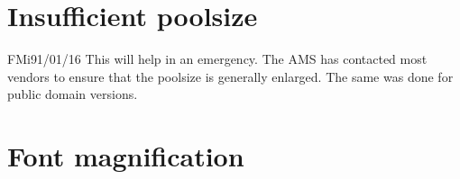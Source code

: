 \tableofcontents

\section{Insufficient poolsize}

\begin{comment}{TF}{91/01/02}
While installing the ``font selection scheme'' from
Mittelbach/Sch\"opf (together with the \ams -Fonts), I
detected several inaccurations which caused runtime
errors under PC\TeX (Ver. 2.93).

Using \ams -Fonts the \TeX -poolsize is exhausted soon,
calling only a few math symbols. While PC\TeX\ users
aren't able to increase the poolsize in the WEB-File
they have to patch the poolfile {\tt tex.poo} (please
make a backup before) which is to be found in the
subdirectory \verb'\pctex\texfmts'.

Normally this file has a structure like
\begin{verbatim}
  nnhelpmessage follows here
\end{verbatim}
each line, for example
\begin{verbatim}
  28End of file on the terminal!
\end{verbatim}
  where {\tt nn} defines the number of characters
  following. PC\TeX\ users can increase their poolsize
  by changing the numeric value to {\tt '00'} and
  filling the rest of the line with blanks. But be
  sure, that you only update lines which are indicated
  as help messages and leave the rest like
\begin{verbatim}
  13m2d5c2l5x2v5i
\end{verbatim}
  untouched. You also shouldn't change the bottom line
  which looks like
\begin{verbatim}
  *363303461
\end{verbatim}
  otherwise PC\TeX\ will run in an infinite loop. The
  disadvantage of this operation -- you won't see the
  erased help messages anymore. For this it is better to
  kill (and it will be enough) only the help messages
  you see when you type  {\tt h} during runtime.
\end{comment}
\begin{remark}{FMi}{91/01/16}
 This will help in an emergency. The AMS has contacted
 most vendors to ensure that the poolsize is generally
 enlarged. The same was done for public domain versions.
\end{remark}


\section{Font magnification}

